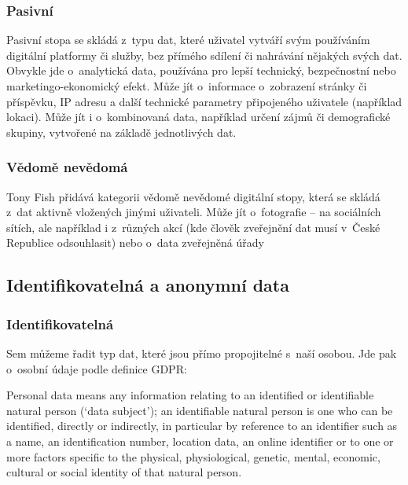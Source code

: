 \subsubsection{Pasivní}

Pasivní stopa se skládá z~typu dat, které uživatel vytváří svým používáním digitální platformy či služby, bez přímého sdílení či nahrávání nějakých svých dat. Obvykle jde o~analytická data, používána pro lepší technický, bezpečnostní nebo marketingo-ekonomický efekt. Může jít o~informace o~zobrazení stránky či příspěvku, IP adresu a další technické parametry připojeného uživatele (například lokaci). Může jít i o~kombinovaná data, například určení zájmů či demografické skupiny, vytvořené na základě jednotlivých dat.

\subsubsection{Vědomě nevědomá}

Tony Fish přidává kategorii vědomě nevědomé digitální stopy, která se skládá z~dat aktivně vložených jinými uživateli\citep{fish-digital-footprint}.
Může jít o~fotografie -- na sociálních sítích, ale například i z~různých akcí (kde člověk zveřejnění dat musí v~České Republice odsouhlasit) nebo o~data zveřejněná úřady

\subsection{Identifikovatelná a anonymní data}

\subsubsection{Identifikovatelná}

Sem můžeme řadit typ dat, které jsou přímo propojitelné s~naší osobou. Jde pak o~osobní údaje podle definice GDPR:

\begin{displayquote}
Personal data means any information relating to an identified or identifiable natural person (‘data subject’); an identifiable natural person is one who can be identified, directly or indirectly, in particular by reference to an identifier such as a name, an identification number, location data, an online identifier or to one or more factors specific to the physical, physiological, genetic, mental, economic, cultural or social identity of that natural person.\citep{gdpr}
\end{displayquote}

